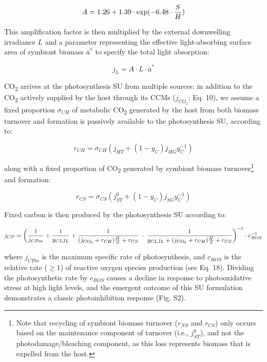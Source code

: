 \documentclass[]{elsarticle} %
\begin{document}
\begin{equation} A = 1.26 + 1.39 \cdot \exp(-6.48 \cdot {S \over H}) \end{equation}

This amplification factor is then multiplied by the external downwelling
irradiance \(L\) and a parameter representing the effective
light-absorbing surface area of symbiont biomass \(\bar{a}^*\) to
specify the total light absorption:

\begin{equation} j_L =  A \cdot L \cdot \bar{a}^* \end{equation}

CO\textsubscript{2} arrives at the photosynthesis SU from multiple
sources: in addition to the CO\textsubscript{2} actively supplied by the
host through its CCMs (\(j_{CO_2}\); Eq. 10), we assume a fixed
proportion \(\sigma_{CH}\) of metabolic CO\textsubscript{2} generated by
the host from both biomass turnover and formation is passively available
to the photosynthesis SU, according to:

\begin{equation} r_{CH}=\sigma_{CH}(j_{HT} + (1-y_C)j_{HG}y_C^{-1}) \end{equation}

along with a fixed proportion of CO\textsubscript{2} generated by
symbiont biomass turnover\footnote{Note that recycling of symbiont
  biomass turnover (\(r_{NS}\) and \(r_{CS}\)) only occurs based on the
  maintenance component of turnover (i.e., \(j_{ST}^0\)), and not the
  photodamage/bleaching component, as this loss represents biomass that
  is expelled from the host.} and formation:

\begin{equation} r_{CS}=\sigma_{CS}(j_{ST}^0 + (1-y_C)j_{SG}y_C^{-1}) \end{equation}

Fixed carbon is then produced by the photosynthesis SU according to:

\begin{equation} j_{CP} = \bigg({1 \over j_{CPm}} + {1 \over {y_{CL} j_L }} + {1 \over {(j_{CO_2} + r_{CH}){H \over S} + r_{CS}}} - {1 \over {y_{CL} j_L + (j_{CO_2} + r_{CH}){H \over S} + r_{CS}}}\bigg)^{-1} \cdot c_{ROS}^{-1} \end{equation}

where \(j_{CPm}\) is the maximum specific rate of photosynthesis, and
\(c_{ROS}\) is the relative rate (\(\ge1\)) of reactive oxygen species
production (see Eq. 18). Dividing the photosynthetic rate by \(c_{ROS}\)
causes a decline in response to photooxidative stress at high light
levels, and the emergent outcome of this SU formulation demonstrates a
classic photoinhibition response (Fig. S2).
\end{document}
